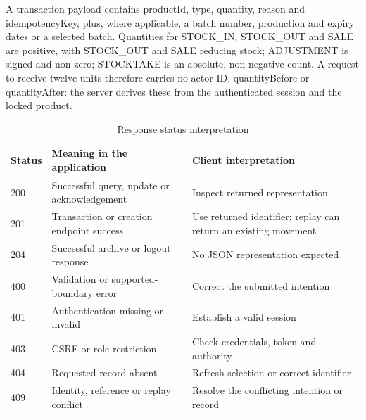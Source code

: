 A transaction payload contains productId, type, quantity, reason and idempotencyKey, plus, where applicable, a batch number, production and expiry dates or a selected batch. Quantities for STOCK\_IN, STOCK\_OUT and SALE are positive, with STOCK\_OUT and SALE reducing stock; ADJUSTMENT is signed and non-zero; STOCKTAKE is an absolute, non-negative count. A request to receive twelve units therefore carries no actor ID, quantityBefore or quantityAfter: the server derives these from the authenticated session and the locked product.


\begin{table}[htbp]\centering\small{}\setlength{\tabcolsep}{3pt}\renewcommand{\arraystretch}{1.25}
\caption{Response status interpretation}\label{tab:status-codes}
\begin{tabular}{>{\raggedright\arraybackslash}p{}>{\raggedright\arraybackslash}p{}>{\raggedright\arraybackslash}p{}}
\toprule
\textbf{Status} & \textbf{Meaning in the application} & \textbf{Client interpretation} \\
\midrule
\leavevmode{}200 & \leavevmode{}Successful query, update or acknowledgement & \leavevmode{}Inspect returned representation \\
\leavevmode{}201 & \leavevmode{}Transaction or creation endpoint success & \leavevmode{}Use returned identifier; replay can return an existing movement \\
\leavevmode{}204 & \leavevmode{}Successful archive or logout response & \leavevmode{}No JSON representation expected \\
\leavevmode{}400 & \leavevmode{}Validation or supported-boundary error & \leavevmode{}Correct the submitted intention \\
\leavevmode{}401 & \leavevmode{}Authentication missing or invalid & \leavevmode{}Establish a valid session \\
\leavevmode{}403 & \leavevmode{}CSRF or role restriction & \leavevmode{}Check credentials, token and authority \\
\leavevmode{}404 & \leavevmode{}Requested record absent & \leavevmode{}Refresh selection or correct identifier \\
\leavevmode{}409 & \leavevmode{}Identity, reference or replay conflict & \leavevmode{}Resolve the conflicting intention or record \\
\bottomrule\end{tabular}\end{table}

